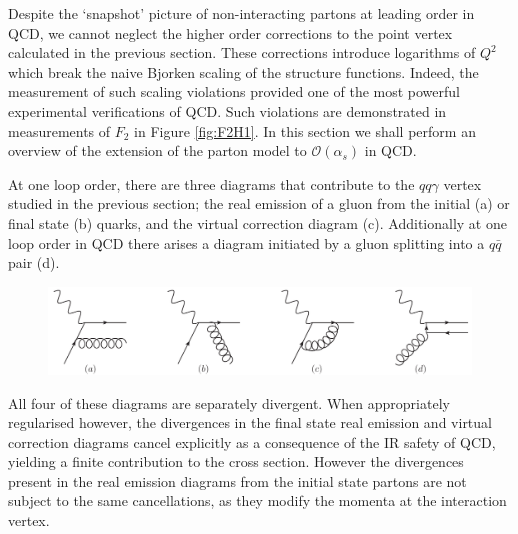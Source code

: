 Despite the `snapshot' picture of non-interacting partons at leading order in QCD, we cannot neglect the higher order corrections to the point vertex calculated in the previous section. These corrections introduce logarithms of $Q^2$ which break the naive Bjorken scaling of the structure functions. Indeed, the measurement of such scaling violations provided one of the most powerful experimental verifications of QCD. Such violations are demonstrated in measurements of $F_2$ in Figure \ref{fig:F2H1}. In this section we shall perform an overview of the extension of the parton model to $\mathcal{O}(\alpha_s)$ in QCD.

At one loop order, there are three diagrams that contribute to the $qq\gamma$ vertex studied in the previous section; the real emission of a gluon from the initial (a) or final state (b) quarks, and the virtual correction diagram (c). Additionally at one loop order in QCD there arises a diagram initiated by a gluon splitting into a $q\bar{q}$ pair (d).

\begin{figure}[ht]
\centering
\includegraphics[scale=0.6]{2-PDFs/figs/1loopDIS.pdf}
\end{figure}

All four of these diagrams are separately divergent. When appropriately regularised however, the divergences in the final state real emission and virtual correction diagrams cancel explicitly as a consequence of the IR safety of QCD, yielding a finite contribution to the cross section. However the divergences present in the real emission diagrams from the initial state partons are not subject to the same cancellations, as they modify the momenta at the interaction vertex. 
 
